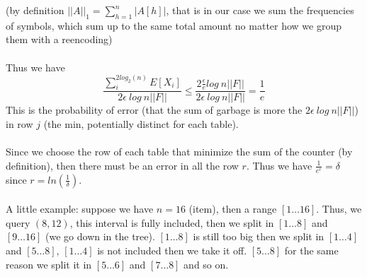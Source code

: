 \documentclass[a4paper]{article}
\begin{document}
\noindent
(by definition $||A||_1 = \sum^n_{h=1}|A[h]|$, that is in our case we sum the frequencies of symbols, which sum up to the same total amount no matter how we group them with a reencoding)
\\
\\
Thus we have $$\frac{\sum_{i}^{2log_2(n)} E[X_i]}{2\epsilon\ log\ n ||F||} \leq \frac{2 \frac{\epsilon}{e}log \ n||F||}{2\epsilon\ log\ n ||F||}= \frac{1}{e}$$
This is the probability of error (that the sum of garbage is more the $2\epsilon\ log\ n ||F||$) in row $j$ (the min, potentially distinct for each table).
\\
\\
Since we choose the row of each table that minimize the sum of the counter (by definition), then there must be an error in all the row $r$. Thus we have $\frac{1}{e^r}=\delta$ since $r=ln(\frac{1}{\delta})$.\\ \\

A little example: suppose we have $n=16$ (item), then a range $[1 \dots 16]$. Thus, we query $(8,12)$, this interval is fully included, then we split in $[1 \dots 8]$ and $[9 \dots 16]$ (we go down in the tree). $[1 \dots 8]$ is still too big then we split in $[1 \dots 4]$ and $[5 \dots 8]$,  $[1 \dots 4]$ is not included then we take it off. $[5 \dots 8]$ for the same reason we split it in $[5 \dots 6]$ and $[7 \dots 8]$ and so on.\\
\end{document}
